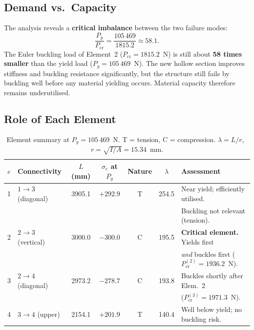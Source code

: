 \documentclass[11pt, a4paper]{article}
\begin{document}
\subsection{Demand vs.\ Capacity}

The analysis reveals a \textbf{critical imbalance} between the two failure modes:
%
\[
\frac{P_y}{P_{\text{cr}}} = \frac{105\,469}{1815.2} \approx 58.1.
\]
%
The Euler buckling load of Element~2 ($P_{\text{cr}}=1815.2$~N) is still about \textbf{58 times smaller} than the yield load ($P_y=105\,469$~N).  The new hollow section improves stiffness and buckling resistance significantly, but the structure still fails by buckling well before any material yielding occurs.  Material capacity therefore remains underutilised.

\subsection{Role of Each Element}

\begin{table}[H]
\centering
\small
\renewcommand{\arraystretch}{1.25}
\begin{tabular}{@{}clccccl@{}}
\toprule
$e$ & Connectivity & $L$ (mm) & $\sigma_e$ at $P_y$ & Nature & $\lambda$ & Assessment \\
\midrule
1 & $1{\to}3$ (diagonal) & 3905.1 & $+292.9$ & T & 254.5 & Near yield; efficiently utilised. \\
  &                       &        &          &   &       & Buckling not relevant (tension). \\[3pt]
2 & $2{\to}3$ (vertical) & 3000.0 & $-300.0$ & C & 195.5 & \textbf{Critical element.} Yields first \\
  &                       &        &          &   &       & \emph{and} buckles first ($P_{\text{cr}}^{(2)}=1936.2$~N). \\[3pt]
3 & $2{\to}4$ (diagonal) & 2973.2 & $-278.7$ & C & 193.8 & Buckles shortly after Elem.~2 \\
  &                       &        &          &   &       & ($P_{\text{cr}}^{(3)}=1971.3$~N). \\[3pt]
4 & $3{\to}4$ (upper)    & 2154.1 & $+201.9$ & T & 140.4 & Well below yield; no buckling risk. \\
\bottomrule
\end{tabular}
\caption{Element summary at $P_y=105\,469$~N.  T = tension, C = compression.  $\lambda = L/r$, \, $r = \sqrt{I/A}=15.34$~mm.}
\label{tab:elem_roles}
\end{table}
\end{document}

